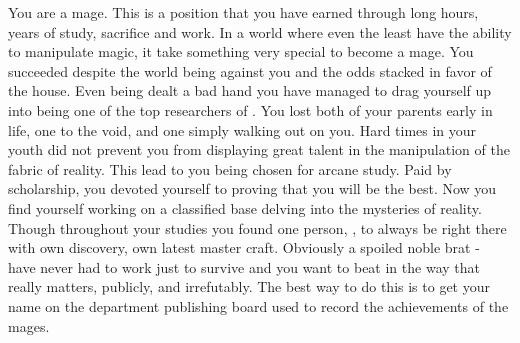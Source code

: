 \documentclass[char]{guildcamp3}
\begin{document}
\name{\cMageTwo{}}


\updatemacro{\cNPC}{
  \unknownplayer %
  }



You are a mage. This is a position that you have earned through long hours, years of study, sacrifice and work. In a world where even the least have the ability to manipulate magic, it take something very special to become a mage. You succeeded despite the world being against you and the odds stacked in favor of the house. Even being dealt a bad hand you have managed to drag yourself up into being one of the top researchers of \bMagicWorld{}. You lost both of your parents early in life, one to the void, and one simply walking out on you. Hard times in your youth did not prevent you from displaying great talent in the manipulation of the fabric of reality. This lead to you being chosen for arcane study. Paid by scholarship, you devoted yourself to proving that you will be the best. Now you find yourself working on a classified base delving into the mysteries of reality. Though throughout your studies you found one person, \cMageOne{\intro}, to always be right there with \cMageOne{\their} own discovery, \cMageOne{\their} own latest master craft. Obviously a spoiled noble brat -  have never had to work just to survive and you want to beat \cMageOne{\them} in the way that really matters, publicly, and irrefutably. The best way to do this is to get your name on the department publishing board used to record the achievements of the mages.
\end{document}
